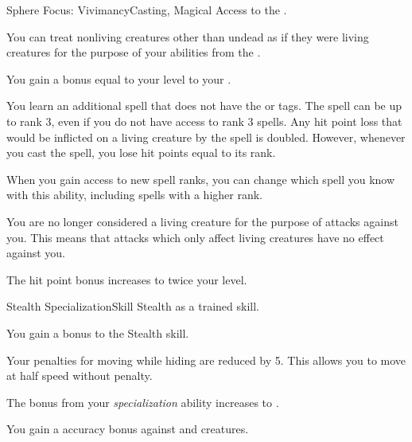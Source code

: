     \begin{magicalfeat}{Sphere Focus: Vivimancy}{Casting, Magical}
        \featpre Access to the  .

         You can treat nonliving creatures other than undead as if they were living creatures for the purpose of your abilities from the  .

         You gain a bonus equal to your level to your .

         You learn an additional spell that does not have the  or  tags.
        The spell can be up to rank 3, even if you do not have access to rank 3 spells.
        Any hit point loss that would be inflicted on a living creature by the spell is doubled.
        However, whenever you cast the spell, you lose hit points equal to its rank.

        When you gain access to new spell ranks, you can change which spell you know with this ability, including spells with a higher rank.

         You are no longer considered a living creature for the purpose of attacks against you.
        This means that attacks which only affect living creatures have no effect against you.

         The hit point bonus increases to twice your level.
    \end{magicalfeat}

    \begin{feat}{Stealth Specialization}{Skill}
        \featpre Stealth as a trained skill.

         You gain a  bonus to the Stealth skill.

         Your penalties for moving while hiding are reduced by 5.
        This allows you to move at half speed without penalty.

         The bonus from your \textit{specialization} ability increases to .

         You gain a  accuracy bonus against \unaware and \partiallyunaware creatures.
    \end{feat}

